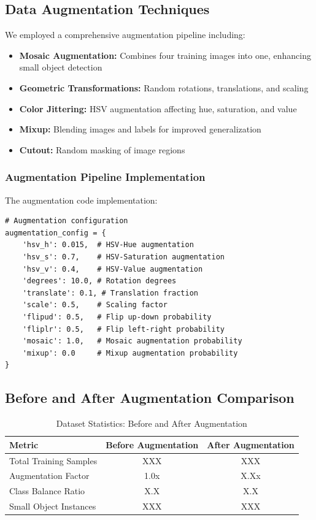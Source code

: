 \documentclass[11pt,a4paper]{article}
\begin{document}
\subsection{Data Augmentation Techniques}

We employed a comprehensive augmentation pipeline including:

\begin{itemize}
    \item \textbf{Mosaic Augmentation:} Combines four training images into one, enhancing small object detection
    \item \textbf{Geometric Transformations:} Random rotations, translations, and scaling
    \item \textbf{Color Jittering:} HSV augmentation affecting hue, saturation, and value
    \item \textbf{Mixup:} Blending images and labels for improved generalization
    \item \textbf{Cutout:} Random masking of image regions
\end{itemize}

\subsubsection{Augmentation Pipeline Implementation}

The augmentation code implementation:
\begin{lstlisting}
# Augmentation configuration
augmentation_config = {
    'hsv_h': 0.015,  # HSV-Hue augmentation
    'hsv_s': 0.7,    # HSV-Saturation augmentation
    'hsv_v': 0.4,    # HSV-Value augmentation
    'degrees': 10.0, # Rotation degrees
    'translate': 0.1, # Translation fraction
    'scale': 0.5,    # Scaling factor
    'flipud': 0.5,   # Flip up-down probability
    'fliplr': 0.5,   # Flip left-right probability
    'mosaic': 1.0,   # Mosaic augmentation probability
    'mixup': 0.0     # Mixup augmentation probability
}
\end{lstlisting}

\subsection{Before and After Augmentation Comparison}

\begin{table}[H]
    \centering
    \caption{Dataset Statistics: Before and After Augmentation}
    \label{tab:augmentation_comparison}
    \begin{tabular}{|l|c|c|}
    \hline
    \textbf{Metric} & \textbf{Before Augmentation} & \textbf{After Augmentation} \\
    \hline
    Total Training Samples & XXX & XXX \\
    Augmentation Factor & 1.0x & X.Xx \\
    Class Balance Ratio & X.X & X.X \\
    Small Object Instances & XXX & XXX \\
    \hline
    \end{tabular}
\end{table}
\end{document}
